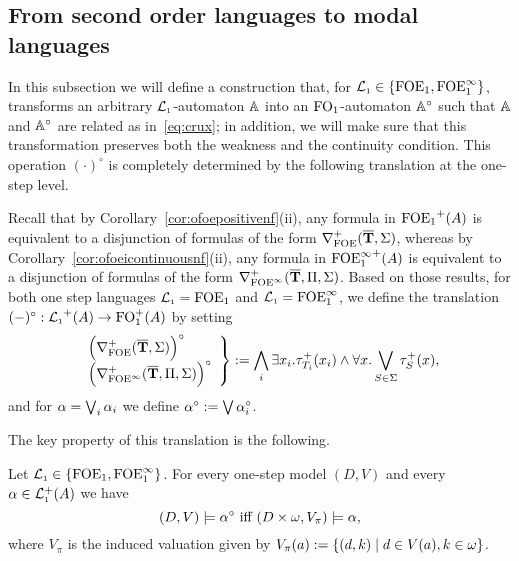 \subsection{From second order languages to modal languages}
\label{ss:mso2mfl}

In this subsection we will define a construction that, for $\mathcal{L}_{\scriptscriptstyle 1} \in
\{{\mathrm{FOE}_1},{\mathrm{FOE}^{\infty}_1}\}$, transforms an arbitrary $\mathcal{L}_{\scriptscriptstyle 1}$-automaton $\mathbb{A}$ into
an $\mathrm{FO}_1$-automaton $\mathbb{A}^{\circ}$ such that $\mathbb{A}$ and $\mathbb{A}^{\circ}$ 
are related as in~\eqref{eq:crux}; in addition, we will make sure that 
this transformation preserves both the weakness and the continuity condition.
This operation $(\cdot)^{\circ}$ is completely determined by the following 
translation at the one-step level.

\begin{definition}
Recall that by Corollary~\ref{cor:ofoepositivenf}(ii), any formula in 
${\mathrm{FOE}_1}^+(A)$ is equivalent to a disjunction of formulas of the form 
$\nabla^+_{\mathrm{FOE}}(\overline{{\mathbf{T}}},\Sigma)$, whereas
by Corollary~\ref{cor:ofoeicontinuousnf}(ii), any formula in ${\mathrm{FOE}^{\infty}_1}^+(A)$ is 
equivalent to a disjunction of formulas of the form 
$\nabla^+_{{\mathrm{FOE}}^\infty}(\overline{{\mathbf{T}}},\Pi,\Sigma)$. 
Based on those results, for both one step languages $\mathcal{L}_{\scriptscriptstyle 1}={\mathrm{FOE}_1}$ and 
$\mathcal{L}_{\scriptscriptstyle 1}={\mathrm{FOE}^{\infty}_1}$, we define the translation 
$(-)^{\circ} : {\mathcal{L}_{\scriptscriptstyle 1}}^+(A) \to \mathrm{FO}_1^+(A)$ by setting
\[
\left.\begin{array}{l}
   \Big( \nabla^+_{\mathrm{FOE}}(\overline{{\mathbf{T}}},\Sigma) \Big)^{\circ} 
\\ \Big( \nabla^+_{{\mathrm{FOE}}^\infty}(\overline{{\mathbf{T}}},\Pi,\Sigma) \Big)^{\circ} 
\end{array}\right\}
\mathrel{: =} \bigwedge_{i} \exists x_i. \tau^+_{T_i}(x_i) \land 
\forall x. \bigvee_{S\in\Sigma} \tau^+_S(x),
\]
and for $\alpha = \bigvee_{i} \alpha_{i}$ we define $\alpha^{\circ} \mathrel{: =} \bigvee 
\alpha_{i}^{\circ}$.
\end{definition}

The key property of this translation is the following.

\begin{proposition}
\label{p-1P}
Let $\mathcal{L}_{\scriptscriptstyle 1}\in \{{\mathrm{FOE}_1},{\mathrm{FOE}^{\infty}_1}\}$.
For every one-step model $(D,V)$ and every $\alpha \in \mathcal{L}_{\scriptscriptstyle 1}^+(A)$ we have
\begin{equation}
\label{eq-1cr}
(D,V) \models \alpha^{\circ} \text{ iff } (D\times \om,V_\pi) \models \alpha,
\end{equation}
where $V_{\pi}$ %
 is the induced valuation given by 
$V_{\pi}(a) \mathrel{: =} \{ (d,k) \mid d \in V(a), k\in\omega\}$.
\end{proposition}

